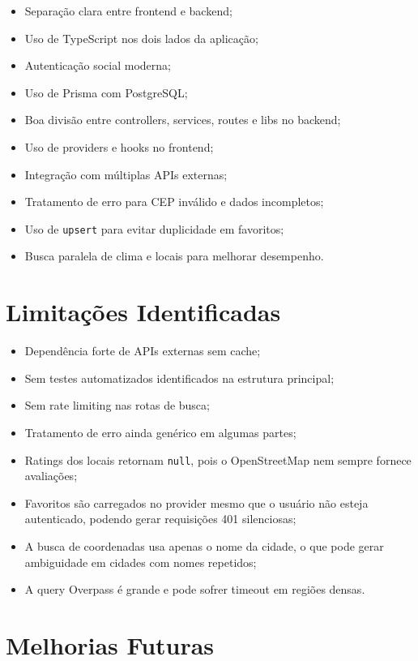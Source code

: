 \documentclass[
    12pt,
    oneside,
    openright,
    a4paper,
    english,
    brazil
]{abntex2}
\begin{document}
\begin{itemize}
    \item Separação clara entre frontend e backend;
    \item Uso de TypeScript nos dois lados da aplicação;
    \item Autenticação social moderna;
    \item Uso de Prisma com PostgreSQL;
    \item Boa divisão entre controllers, services, routes e libs no backend;
    \item Uso de providers e hooks no frontend;
    \item Integração com múltiplas APIs externas;
    \item Tratamento de erro para CEP inválido e dados incompletos;
    \item Uso de \texttt{upsert} para evitar duplicidade em favoritos;
    \item Busca paralela de clima e locais para melhorar desempenho.
\end{itemize}

\section{Limitações Identificadas}

\begin{itemize}
    \item Dependência forte de APIs externas sem cache;
    \item Sem testes automatizados identificados na estrutura principal;
    \item Sem rate limiting nas rotas de busca;
    \item Tratamento de erro ainda genérico em algumas partes;
    \item Ratings dos locais retornam \texttt{null}, pois o OpenStreetMap nem sempre fornece avaliações;
    \item Favoritos são carregados no provider mesmo que o usuário não esteja autenticado, podendo gerar requisições 401 silenciosas;
    \item A busca de coordenadas usa apenas o nome da cidade, o que pode gerar ambiguidade em cidades com nomes repetidos;
    \item A query Overpass é grande e pode sofrer timeout em regiões densas.
\end{itemize}

\section{Melhorias Futuras}
\end{document}
